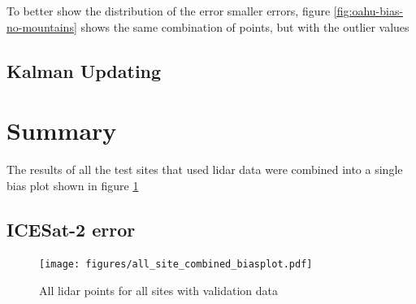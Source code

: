 To better show the distribution of the error smaller errors, figure \ref{fig:oahu-bias-no-mountains} shows the same combination of points, but with the outlier values 

\subsection{Kalman Updating}

\section{Summary}
The results of all the test sites that used lidar data were combined into a single bias plot shown in figure \ref{fig:all-sites-biasplot}

\subsection{ICESat-2 error}

\begin{figure}[h]
    \centering
    \texttt{[image: figures/all\_site\_combined\_biasplot.pdf]}
    \caption{All lidar points for all sites with validation data}
    \label{fig:all-sites-biasplot}
\end{figure}

